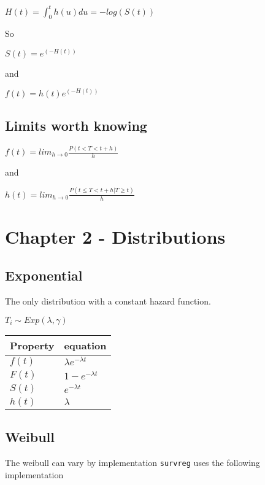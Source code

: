 \documentclass[
  letterpaper,
  DIV=11,
  numbers=noendperiod]{scrreprt}
\begin{document}
\(H(t) = \int^{t}_0 h(u) du = -log(S(t))\)

So

\(S(t) = e^{\left(-H(t)\right)}\)

and

\(f(t) = h(t)e^{\left(-H(t)\right)}\)

\hypertarget{limits-worth-knowing}{%
\subsection{Limits worth knowing}\label{limits-worth-knowing}}

\(f(t) = lim_{h \rightarrow 0 } \frac{P(t < T < t+h)}{h}\)

and

\(h(t) = lim_{h \rightarrow 0 } \frac{P(t \leq T < t+h | T \geq t)}{h}\)

\hypertarget{chapter-2---distributions}{%
\section{Chapter 2 - Distributions}\label{chapter-2---distributions}}

\hypertarget{exponential}{%
\subsection{Exponential}\label{exponential}}

The only distribution with a constant hazard function.

\(T_i \sim Exp(\lambda, \gamma)\)

\begin{longtable}[]{@{}ll@{}}
\toprule()
Property & equation \\
\midrule()
\endhead
\(f(t)\) & \(\lambda e^{-\lambda t}\) \\
\(F(t)\) & \(1 - e^{-\lambda t}\) \\
\(S(t)\) & \(e^{-\lambda t}\) \\
\(h(t)\) & \(\lambda\) \\
\bottomrule()
\end{longtable}

\hypertarget{weibull}{%
\subsection{Weibull}\label{weibull}}

The weibull can vary by implementation \texttt{survreg} uses the
following implementation
\end{document}
